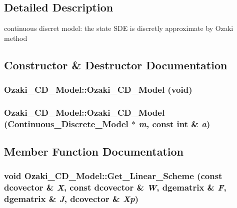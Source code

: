 \subsection{Detailed Description}
continuous discret model: the state SDE is discretly approximate by Ozaki method 

\subsection{Constructor \& Destructor Documentation}
\hypertarget{class_ozaki___c_d___model_97b6866d8dc6ea653b686ed224d4dc48}{
\subsubsection[{Ozaki\_\-CD\_\-Model}]{\setlength{\rightskip}{0pt plus 5cm}Ozaki\_\-CD\_\-Model::Ozaki\_\-CD\_\-Model (void)}}
\label{class_ozaki___c_d___model_97b6866d8dc6ea653b686ed224d4dc48}


\hypertarget{class_ozaki___c_d___model_d3a96828c7830a244327f890f8b90a65}{
\subsubsection[{Ozaki\_\-CD\_\-Model}]{\setlength{\rightskip}{0pt plus 5cm}Ozaki\_\-CD\_\-Model::Ozaki\_\-CD\_\-Model ({\bf Continuous\_\-Discrete\_\-Model} $\ast$ {\em m}, \/  const int \& {\em a})}}
\label{class_ozaki___c_d___model_d3a96828c7830a244327f890f8b90a65}




\subsection{Member Function Documentation}
\hypertarget{class_ozaki___c_d___model_c0878d9dda14cd1294e2ce7e5ab9c281}{
\subsubsection[{Get\_\-Linear\_\-Scheme}]{\setlength{\rightskip}{0pt plus 5cm}void Ozaki\_\-CD\_\-Model::Get\_\-Linear\_\-Scheme (const dcovector \& {\em X}, \/  const dcovector \& {\em W}, \/  dgematrix \& {\em F}, \/  dgematrix \& {\em J}, \/  dcovector \& {\em Xp})}}
\label{class_ozaki___c_d___model_c0878d9dda14cd1294e2ce7e5ab9c281}


